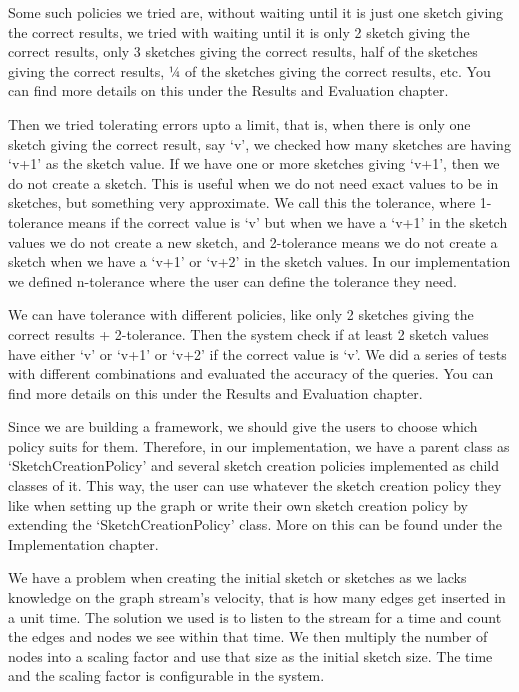 \documentclass[conference]{IEEEtran}
\begin{document}
Some such policies we tried are, without waiting until it is just one sketch giving the correct results, we tried with waiting until it is only 2 sketch giving the correct results, only 3 sketches giving the correct results, half of the sketches giving the correct results, ¼ of the sketches giving the correct results, etc.  You can find more details on this under the Results and Evaluation chapter.


Then we tried tolerating errors upto a limit, that is, when there is only one sketch giving the correct result, say ‘v’, we checked how many sketches are having ‘v+1’ as the sketch value. If we have one or more sketches giving ‘v+1’, then we do not create a sketch. This is useful when we do not need exact values to be in sketches, but something very approximate. We call this the tolerance, where 1-tolerance means if the correct value is ‘v’ but when we have a ‘v+1’ in the sketch values we do not create a new sketch, and 2-tolerance means we do not create a sketch when we have a ‘v+1’ or ‘v+2’ in the sketch values. In our implementation we defined n-tolerance where the user can define the tolerance they need. 



We can have tolerance with different policies, like  only 2 sketches giving the correct results + 2-tolerance. Then the system check if at least 2 sketch values have either ‘v’ or ‘v+1’ or ‘v+2’ if the correct value is ‘v’. We did a series of tests with different combinations and evaluated the accuracy of the queries. You can find more details on this under the Results and Evaluation chapter.


Since we are building a framework, we should give the users to choose which policy suits for them. Therefore, in our implementation, we have a parent class as ‘SketchCreationPolicy’ and several sketch creation policies implemented as child classes of it. This way, the user can use whatever the sketch creation policy they like when setting up the graph or write their own sketch creation policy by extending the ‘SketchCreationPolicy’ class. More on this can be found under the Implementation chapter.



We have a problem when creating the initial sketch or sketches as we lacks knowledge on the graph stream's velocity, that is how many edges get inserted in a unit time. The solution we used is to listen to the stream for a time and count the edges and nodes we see within that time. We then multiply the number of nodes into a scaling factor and use that size as the initial sketch size. The time and the scaling factor is configurable in the system.
\end{document}
